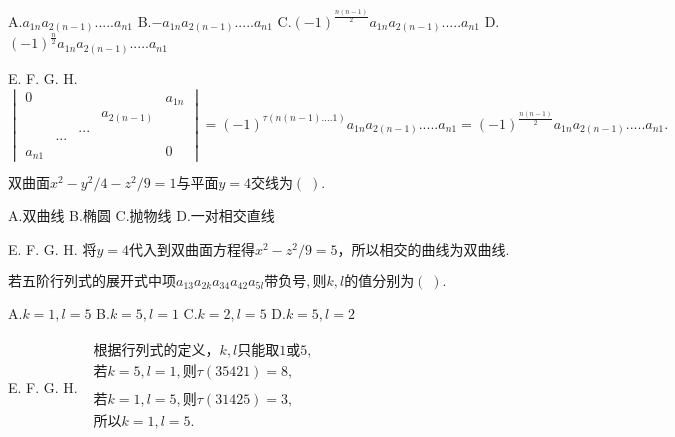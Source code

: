 A.$a_{1n}a_{2(n-1)}.....a_{n1}$   B.$-a_{1n}a_{2(n-1)}.....a_{n1}$   C.$(-1)^{\textstyle\frac{n(n-1)}2}a_{1n}a_{2(n-1)}.....a_{n1}$   D.$(-1)^{\textstyle\frac n2}a_{1n}a_{2(n-1)}.....a_{n1}$

E.   F.   G.   H.
$\begin{vmatrix}0&&&&a_{1n}\\&&&a_{2(n-1)}&\\&&...&&\\&...&&&\\a_{n1}&&&&0\end{vmatrix}=(-1)^{\tau(n(n-1)....1)}a_{1n}a_{2(n-1)}.....a_{n1}=(-1)^{\textstyle\frac{n(n-1)}2}a_{1n}a_{2(n-1)}.....a_{n1}.$


$\mathrm{双曲面}x^2-y^2/4-z^2/9=1\mathrm{与平面}y=4\mathrm{交线为}(\;).$

A.$\mathrm{双曲线}$   B.$\mathrm{椭圆}$   C.$\mathrm{抛物线}$   D.$\mathrm{一对相交直线}$

E.   F.   G.   H.
$将y=4\mathrm{代入到双曲面方程得}x^2-z^2/9=5，\mathrm{所以相交的曲线为双曲线}.$


$\mathrm{若五阶行列式的展开式中项}a_{13}a_{2k}a_{34}a_{42}a_{5l}\mathrm{带负号},\mathrm 则k,l\mathrm{的值分别为}(\;).$

A.$k=1,l=5$   B.$k=5,l=1$   C.$k=2,l=5$   D.$k=5,l=2$

E.   F.   G.   H.
$\begin{array}{l}\begin{array}{l}\mathrm{根据行列式的定义}，k,l\mathrm{只能取}1或5,\\若k=5,l=1,则\tau(35421)=8,\end{array}\\\begin{array}{l}若k=1,l=5,则\tau(31425)=3,\\\mathrm{所以}k=1,l=5.\\\end{array}\end{array}$




